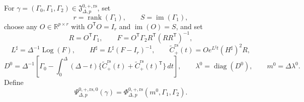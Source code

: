 For \(\gamma=(\Gamma_0,\Gamma_1,\Gamma_2)\in
\mathfrak J_{\Delta,p}^{0,+,\mathrm{rs}}\), set
\[
 r=\operatorname{rank}(\Gamma_1),\qquad S=\operatorname{im}(\Gamma_1),
\]
choose any \(O\in\mathbb R^{p\times r}\) with \(O^{\mathsf T}O=I_r\) and \(\operatorname{im}(O)=S\), and set
\[
 R=O^{\mathsf T}\Gamma_1,\qquad
 F=O^{\mathsf T}\Gamma_2R^{\mathsf T}(RR^{\mathsf T})^{-1},
\]
\[
 L^\sharp=\Delta^{-1}\operatorname{Log}(F),\qquad
 H^\sharp=L^\sharp(F-I_r)^{-1},\qquad
 \widetilde C_{+}^{\mathrm{rs}}(t)
 =Oe^{L^\sharp t}(H^\sharp)^2R,
\]
\[
 D^0=\Delta^{-1}\!\left[
 \Gamma_0-\int_0^\Delta(\Delta-t)
 \{\widetilde C_{+}^{\mathrm{rs}}(t)
  +\widetilde C_{+}^{\mathrm{rs}}(t)^{\mathsf T}\}\,dt\right],
 \qquad \lambda^0=\operatorname{diag}(D^0),
 \qquad m^0=\Delta\lambda^0.
\]
Define
\[
 \Psi_{\Delta,p}^{0,+,\mathrm{rs},0}(\gamma)
 =\Phi_{\Delta,p}^{0,+,\mathrm{rs}}(m^0,\Gamma_1,\Gamma_2).
\]